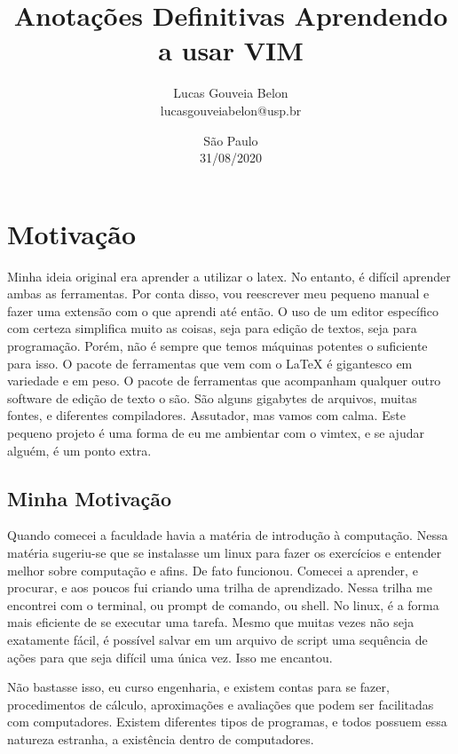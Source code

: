 \documentclass[a4paper, 12pt]{article}
\begin{document}
\title{
    \textbf{
    Anotações Definitivas
    }
    \break
    Aprendendo a usar VIM
}
\author{
    Lucas Gouveia Belon
    \\
    lucasgouveiabelon@usp.br
}

\date{\vspace{2.2cm}São Paulo\\31/08/2020}

\maketitle
\newpage
\tableofcontents
\newpage

\section{Motivação}
Minha ideia original era aprender a utilizar o latex.
No entanto, é difícil aprender ambas as ferramentas.
Por conta disso, vou reescrever meu pequeno manual e fazer uma extensão com o que aprendi até então.
O uso de um editor específico com certeza simplifica muito as coisas, seja para edição de textos, seja para programação.
Porém, não é sempre que temos máquinas potentes o suficiente para isso.
O pacote de ferramentas que vem com o \LaTeX \hspace{0.5cm} é gigantesco em variedade e em peso.
O pacote de ferramentas que acompanham qualquer outro software de edição de texto o são.
São alguns gigabytes de arquivos, muitas fontes, e diferentes compiladores.
Assutador, mas vamos com calma.
Este pequeno projeto é uma forma de eu me ambientar com o vimtex, e se ajudar alguém, é um ponto extra.
\subsection{Minha Motivação}
Quando comecei a faculdade havia a matéria de introdução à computação.
Nessa matéria sugeriu-se que se instalasse um linux para fazer os exercícios e entender melhor sobre computação e afins.
De fato funcionou.
Comecei a aprender, e procurar, e aos poucos fui criando uma trilha de aprendizado.
Nessa trilha me encontrei com o terminal, ou prompt de comando, ou shell.
No linux, é a forma mais eficiente de se executar uma tarefa.
Mesmo que muitas vezes não seja exatamente fácil, é possível salvar em um arquivo de script uma sequência de ações para que seja difícil uma única vez.
Isso me encantou.

Não bastasse isso, eu curso engenharia, e existem contas para se fazer, procedimentos de cálculo, aproximações e avaliações que podem ser facilitadas com computadores.
Existem diferentes tipos de programas, e todos possuem essa natureza estranha, a existência dentro de computadores.
\end{document}
